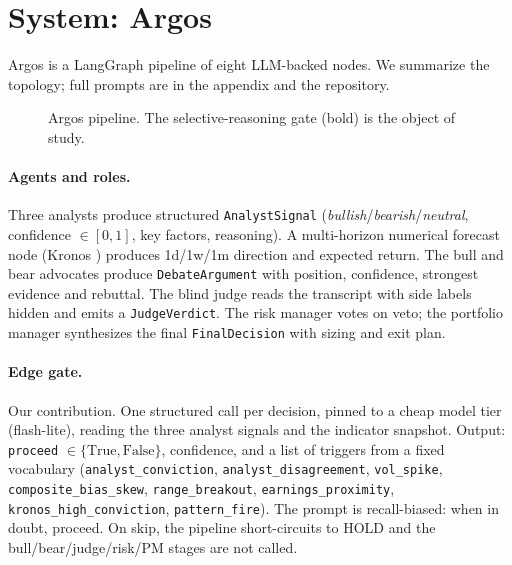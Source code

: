 \documentclass[11pt,a4paper]{article}
\begin{document}
\section{System: Argos}
\label{sec:system}

Argos is a LangGraph \citep{langgraph} pipeline of eight LLM-backed nodes.
We summarize the topology; full prompts are in the appendix and the
repository.

\begin{figure}[h]
  \centering
  \caption{Argos pipeline. The selective-reasoning gate (bold) is the
  object of study.}
  \label{fig:topology}
\end{figure}

\paragraph{Agents and roles.}
Three analysts produce structured \texttt{AnalystSignal}
(\textit{bullish}/\textit{bearish}/\textit{neutral}, confidence
$\in[0,1]$, key factors, reasoning). A multi-horizon numerical forecast
node (Kronos \citep{kronos}) produces 1d/1w/1m direction and expected
return. The bull and bear advocates produce \texttt{DebateArgument} with
position, confidence, strongest evidence and rebuttal. The blind judge
reads the transcript with side labels hidden and emits a
\texttt{JudgeVerdict}. The risk manager votes on veto; the portfolio
manager synthesizes the final \texttt{FinalDecision} with sizing and
exit plan.

\paragraph{Edge gate.}
Our contribution. One structured call per decision, pinned to a cheap
model tier (flash-lite), reading the three analyst signals and the
indicator snapshot. Output: \texttt{proceed} $\in \{\mathrm{True},
\mathrm{False}\}$, confidence, and a list of triggers from a fixed
vocabulary (\texttt{analyst\_conviction}, \texttt{analyst\_disagreement},
\texttt{vol\_spike}, \texttt{composite\_bias\_skew}, \texttt{range\_breakout},
\texttt{earnings\_proximity}, \texttt{kronos\_high\_conviction},
\texttt{pattern\_fire}). The prompt is recall-biased: when in doubt,
proceed. On skip, the pipeline short-circuits to HOLD and the
bull/bear/judge/risk/PM stages are not called.
\end{document}
